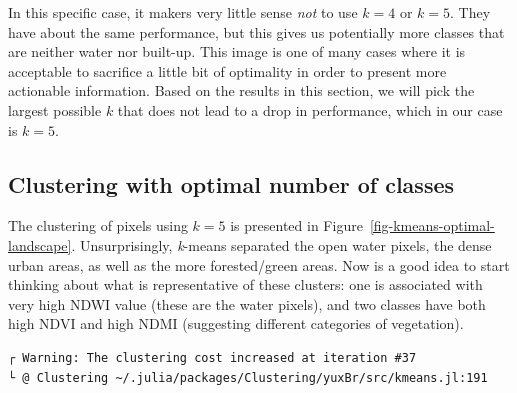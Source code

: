 \documentclass[
  letterpaper,
]{scrbook}
\begin{document}
In this specific case, it makers very little sense \emph{not} to use
\(k = 4\) or \(k = 5\). They have about the same performance, but this
gives us potentially more classes that are neither water nor built-up.
This image is one of many cases where it is acceptable to sacrifice a
little bit of optimality in order to present more actionable
information. Based on the results in this section, we will pick the
largest possible \(k\) that does not lead to a drop in performance,
which in our case is \(k=5\).

\subsection{Clustering with optimal number of
classes}\label{clustering-with-optimal-number-of-classes}

The clustering of pixels using \(k = 5\) is presented in
Figure~\ref{fig-kmeans-optimal-landscape}. Unsurprisingly,
\emph{k}-means separated the open water pixels, the dense urban areas,
as well as the more forested/green areas. Now is a good idea to start
thinking about what is representative of these clusters: one is
associated with very high NDWI value (these are the water pixels), and
two classes have both high NDVI and high NDMI (suggesting different
categories of vegetation).

\begin{verbatim}
┌ Warning: The clustering cost increased at iteration #37
└ @ Clustering ~/.julia/packages/Clustering/yuxBr/src/kmeans.jl:191
\end{verbatim}

\begin{figure}[bt]



\end{figure}%
\end{document}
